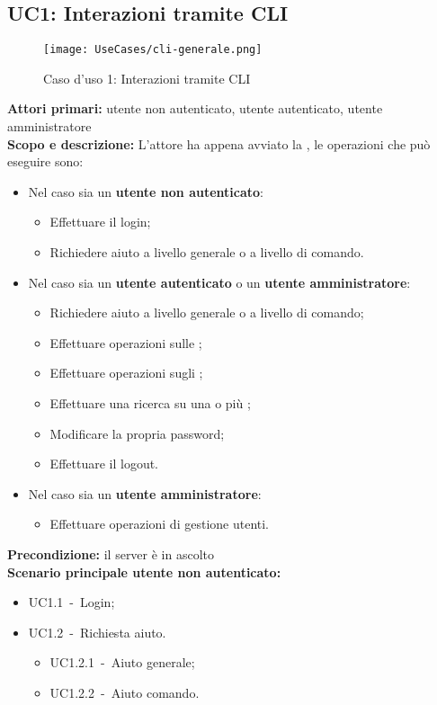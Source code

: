 \documentclass{scalatekids-article}
\begin{document}
\subsection{UC1: Interazioni tramite CLI}

\begin{figure}[H]
  \begin{center}
    \texttt{[image: UseCases/cli-generale.png]}
    \caption*{Caso d'uso 1: Interazioni tramite CLI}
  \end{center}
\end{figure}
\textbf{Attori primari:} utente non autenticato, utente autenticato, utente amministratore\\
\textbf{Scopo e descrizione:} L'attore ha appena avviato la , le operazioni che può eseguire sono:
\begin{itemize}
\item Nel caso sia un \textbf{utente non autenticato}:
  \begin{itemize}
  \item Effettuare il login;
  \item Richiedere aiuto a livello generale o a livello di comando.
  \end{itemize}
\item Nel caso sia un \textbf{utente autenticato} o un \textbf{utente amministratore}:
  \begin{itemize}
  \item Richiedere aiuto a livello generale o a livello di comando;
  \item Effettuare operazioni sulle ;
  \item Effettuare operazioni sugli ;
  \item Effettuare una ricerca su una o più ;
  \item Modificare la propria password;
  \item Effettuare il logout.
  \end{itemize}
\item Nel caso sia un \textbf{utente amministratore}:
  \begin{itemize}
  \item Effettuare operazioni di gestione utenti.
  \end{itemize}
\end{itemize}
\textbf{Precondizione:} il server è in ascolto\\
\textbf{Scenario principale utente non autenticato:}
\begin{itemize}
\item UC1.1\ -\ Login;
\item UC1.2\ -\ Richiesta aiuto.
  \begin{itemize}
  \item UC1.2.1\ -\ Aiuto generale;
  \item UC1.2.2\ -\ Aiuto comando.
  \end{itemize}
\end{itemize}
\end{document}
